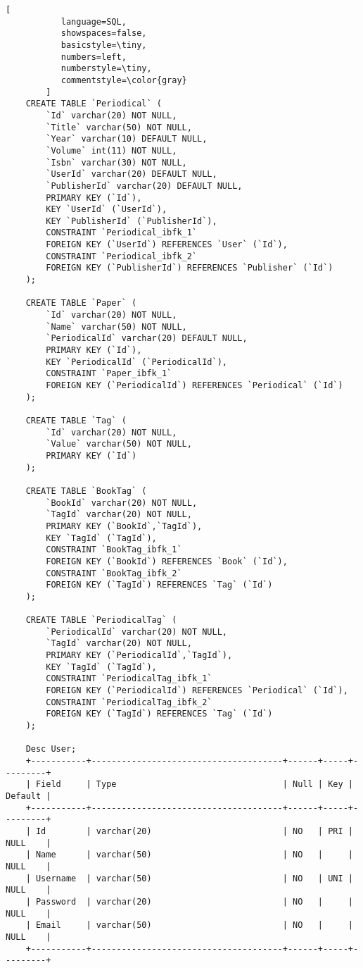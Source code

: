 \documentclass[12pt]{article}
\begin{document}
\begin{lstlisting}[
           language=SQL,
           showspaces=false,
           basicstyle=\tiny,
           numbers=left,
           numberstyle=\tiny,
           commentstyle=\color{gray}
        ]
	CREATE TABLE `Periodical` (
  		`Id` varchar(20) NOT NULL,
  		`Title` varchar(50) NOT NULL,
  		`Year` varchar(10) DEFAULT NULL,
  		`Volume` int(11) NOT NULL,
  		`Isbn` varchar(30) NOT NULL,
  		`UserId` varchar(20) DEFAULT NULL,
  		`PublisherId` varchar(20) DEFAULT NULL,
  		PRIMARY KEY (`Id`),
  		KEY `UserId` (`UserId`),
  		KEY `PublisherId` (`PublisherId`),
  		CONSTRAINT `Periodical_ibfk_1`
  		FOREIGN KEY (`UserId`) REFERENCES `User` (`Id`),
		CONSTRAINT `Periodical_ibfk_2` 
		FOREIGN KEY (`PublisherId`) REFERENCES `Publisher` (`Id`)
	);
	
	CREATE TABLE `Paper` (
  		`Id` varchar(20) NOT NULL,
  		`Name` varchar(50) NOT NULL,
  		`PeriodicalId` varchar(20) DEFAULT NULL,
  		PRIMARY KEY (`Id`),
  		KEY `PeriodicalId` (`PeriodicalId`),
  		CONSTRAINT `Paper_ibfk_1` 
  		FOREIGN KEY (`PeriodicalId`) REFERENCES `Periodical` (`Id`)
	);
	
	CREATE TABLE `Tag` (
 		`Id` varchar(20) NOT NULL,
  		`Value` varchar(50) NOT NULL,
  		PRIMARY KEY (`Id`)
	);
	
	CREATE TABLE `BookTag` (
  		`BookId` varchar(20) NOT NULL,
  		`TagId` varchar(20) NOT NULL,
  		PRIMARY KEY (`BookId`,`TagId`),
  		KEY `TagId` (`TagId`),
  		CONSTRAINT `BookTag_ibfk_1` 
  		FOREIGN KEY (`BookId`) REFERENCES `Book` (`Id`),
  		CONSTRAINT `BookTag_ibfk_2` 
  		FOREIGN KEY (`TagId`) REFERENCES `Tag` (`Id`)
	);
	
	CREATE TABLE `PeriodicalTag` (
  		`PeriodicalId` varchar(20) NOT NULL,
  		`TagId` varchar(20) NOT NULL,
  		PRIMARY KEY (`PeriodicalId`,`TagId`),
  		KEY `TagId` (`TagId`),
  		CONSTRAINT `PeriodicalTag_ibfk_1` 
  		FOREIGN KEY (`PeriodicalId`) REFERENCES `Periodical` (`Id`),
  		CONSTRAINT `PeriodicalTag_ibfk_2` 
  		FOREIGN KEY (`TagId`) REFERENCES `Tag` (`Id`)
	);
	
	Desc User;	
	+-----------+--------------------------------------+------+-----+---------+
	| Field     | Type                                 | Null | Key | Default |
	+-----------+--------------------------------------+------+-----+---------+
	| Id        | varchar(20)                          | NO   | PRI | NULL    |
	| Name      | varchar(50)                          | NO   |     | NULL    |
	| Username  | varchar(50)                          | NO   | UNI | NULL    |
	| Password  | varchar(20)                          | NO   |     | NULL    |
	| Email     | varchar(50)                          | NO   |     | NULL    |
	+-----------+--------------------------------------+------+-----+---------+
 		        

\end{lstlisting}
\end{document}

